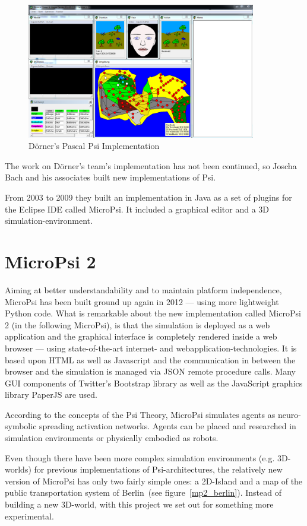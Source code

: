\begin{figure}[h]
  \centering
    \includegraphics[width=10cm]{graphics/psi_screen1}
  \caption{Dörner's Pascal Psi Implementation}
  \label{psi_screen}
\end{figure}

The work on Dörner's team's implementation has not been continued, so Joscha Bach and his associates built new implementations of Psi.

From 2003 to 2009 they built an implementation in Java as a set of plugins for the Eclipse IDE called MicroPsi. It included a graphical editor and a 3D simulation-environment. 

    \section{MicroPsi 2}
Aiming at better understandability and to maintain platform independence, MicroPsi has been built ground up again in 2012 --- using more lightweight Python code. What is remarkable about the new implementation called MicroPsi 2 (in the following MicroPsi), is that the simulation is deployed as a web application and the graphical interface is completely rendered inside a web browser --- using state-of-the-art internet- and webapplication-technologies. It is based upon HTML as well as Javascript and the communication in between the browser and the simulation is managed via JSON remote procedure calls. Many GUI components of Twitter's Bootstrap library as well as the JavaScript graphics library PaperJS are used.~\cite{conf/agi/Bach12}

According to the concepts of the Psi Theory, MicroPsi simulates agents as neuro-symbolic spreading activation networks. Agents can be placed and researched in simulation environments or physically embodied as robots.~\cite{conf/agi/Bach12}
        
Even though there have been more complex simulation environments (e.g. 3D-worlds) for previous implementations of Psi-architectures, the relatively new version of MicroPsi has only two fairly simple ones: a 2D-Island and a map of the public transportation system of Berlin~(see figure~\ref{mp2_berlin}). Instead of building a new 3D-world, with this project we set out for something more experimental.

